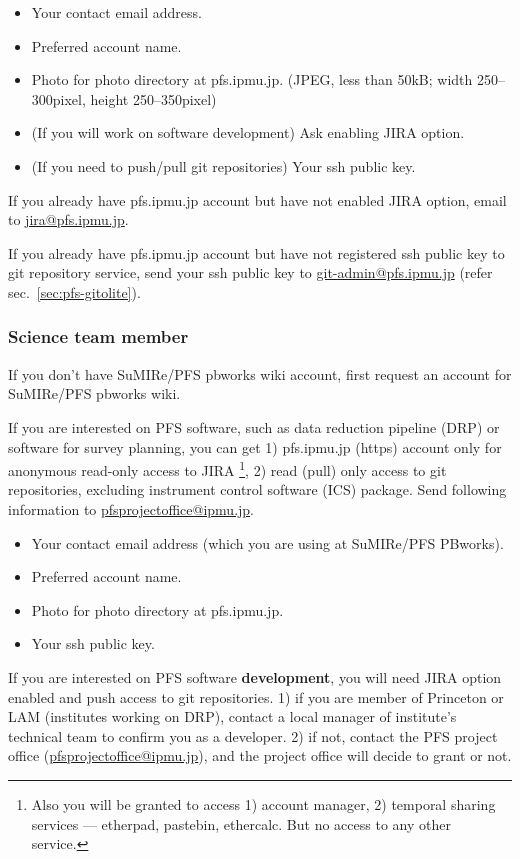 \documentclass[a4paper,notitlepage]{article}
\begin{document}
\begin{itemize}
  \item Your contact email address.
  \item Preferred account name.
  \item Photo for photo directory at pfs.ipmu.jp. (JPEG, less than 50kB; width 
    250--300pixel, height 250--350pixel)
  \item (If you will work on software development) Ask enabling JIRA option.
  \item (If you need to push/pull git repositories) Your ssh public key.
\end{itemize}

If you already have pfs.ipmu.jp account but have not enabled JIRA option, 
email to \url{jira@pfs.ipmu.jp}. 

If you already have pfs.ipmu.jp account but have not registered ssh public 
key to git repository service, send your ssh public key to 
\url{git-admin@pfs.ipmu.jp} (refer sec.~\ref{sec:pfs-gitolite}).

\subsubsection{Science team member}

If you don't have SuMIRe/PFS pbworks wiki account, first request an account 
for SuMIRe/PFS pbworks wiki. 

If you are interested on PFS software, such as data reduction pipeline (DRP) 
or software for survey planning, you can get 1) pfs.ipmu.jp (https) account 
only for anonymous read-only access to JIRA 
\footnote{Also you will be granted to access 1) account manager, 2) temporal 
sharing services --- etherpad, pastebin, ethercalc. But no access to any other 
service.}, 
2) read (pull) only access to git repositories, excluding instrument control 
software (ICS) package. Send following information to 
\url{pfsprojectoffice@ipmu.jp}. 

\begin{itemize}
  \item Your contact email address (which you are using at SuMIRe/PFS PBworks).
  \item Preferred account name.
  \item Photo for photo directory at pfs.ipmu.jp.
  \item Your ssh public key.
\end{itemize}

If you are interested on PFS software {\bf development}, you will need 
JIRA option enabled and push access to git repositories. 
1) if you are member of Princeton or LAM (institutes working on DRP), contact 
a local manager of institute's technical team to confirm you as a developer. 
2) if not, contact the PFS project office (\url{pfsprojectoffice@ipmu.jp}), 
and the project office will decide to grant or not. 
\end{document}
